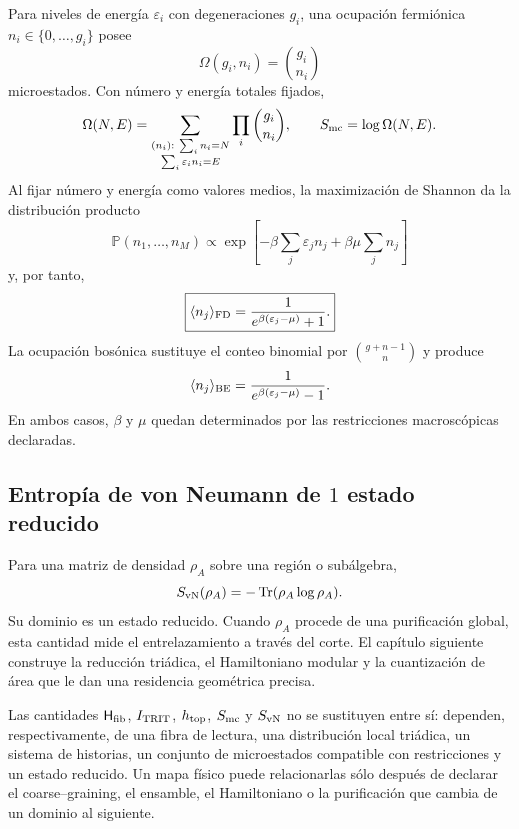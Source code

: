 Para niveles de energía \(\varepsilon_i\) con degeneraciones \(g_i\), una
ocupación fermiónica \(n_i\in\{0,\ldots,g_i\}\) posee
\[
 \Omega(g_i,n_i)=\binom{g_i}{n_i}
\]
microestados. Con número y energía totales fijados,
\begin{equation}
 \Omega(N,E)=
 \sum_{\substack{(n_i):\ \sum_i n_i=N\\
                         \sum_i\varepsilon_i n_i=E}}
 \prod_i\binom{g_i}{n_i},
 \qquad
 S_{\rm mc}=\log\Omega(N,E).
 \label{eq:entropia-microcanonica-anexo}
\end{equation}
Al fijar número y energía como valores medios, la maximización de Shannon
\cite{Shannon1948} da
la distribución producto
\[
 \mathbb P(n_1,\ldots,n_M)
 \propto
 \exp\!\left[-\beta\sum_j\varepsilon_jn_j
              +\beta\mu\sum_j n_j\right]
\]
y, por tanto,
\begin{equation}
 \boxed{
 \langle n_j\rangle_{\rm FD}
 =\frac{1}{e^{\beta(\varepsilon_j-\mu)}+1}.}
 \label{eq:fermi-dirac-entropia-anexo}
\end{equation}
La ocupación bosónica sustituye el conteo binomial por
\(\binom{g+n-1}{n}\) y produce
\[
 \langle n_j\rangle_{\rm BE}
 =\frac{1}{e^{\beta(\varepsilon_j-\mu)}-1}.
\]
En ambos casos, \(\beta\) y \(\mu\) quedan determinados por las restricciones
macroscópicas declaradas.

\subsection{Entropía de von Neumann de \(1\) estado reducido}

Para una matriz de densidad \(\rho_A\) sobre una región o subálgebra,
\[
 S_{\rm vN}(\rho_A)=-\operatorname{Tr}(\rho_A\log\rho_A).
\]
Su dominio es un estado reducido. Cuando \(\rho_A\) procede de una
purificación global, esta cantidad mide el entrelazamiento a través del corte.
El capítulo siguiente construye la reducción triádica, el Hamiltoniano modular
y la cuantización de área que le dan una residencia geométrica precisa.

\begin{proposition}
\label{prop:cinco-entropias-tipadas}
Las cantidades \(\mathsf H_{\rm fib}\), \(I_{\rm TRIT}\), \(h_{\rm top}\),
\(S_{\rm mc}\) y \(S_{\rm vN}\) no se sustituyen entre sí: dependen,
respectivamente, de una fibra de lectura, una distribución local triádica, un
sistema de historias, un conjunto de microestados compatible con restricciones
y un estado reducido. Un mapa físico puede relacionarlas sólo después de
declarar el coarse--graining, el ensamble, el Hamiltoniano o la purificación
que cambia de un dominio al siguiente.
\end{proposition}

